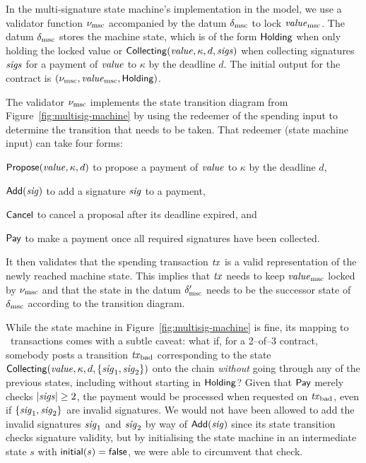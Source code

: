 In the multi-signature state machine's implementation in the \EUTXO{} model, we use a validator
function $\nu_{\mathrm{msc}}$ accompanied by the datum $\delta_{\mathrm{msc}}$ to lock
$\mathit{value}_{\mathrm{msc}}$. The datum $\delta_{\mathrm{msc}}$ stores the machine state,
which is of the form \(\mathsf{Holding}\) when only holding the locked value
or \(\mathsf{Collecting}(\mathit{value}, \kappa, d, \mathit{sigs})\) when collecting
signatures $\mathit{sigs}$ for a payment of $\mathit{value}$ to $\kappa$ by the deadline
$d$. The initial output for the contract is \((\nu_{\mathrm{msc}}, \mathit{value}_{\mathrm{msc}},
\mathsf{Holding})\).

The validator $\nu_{\mathrm{msc}}$ implements the state transition diagram from
Figure~\ref{fig:multisig-machine} by using the redeemer of the spending input to determine the transition that needs to be taken. That redeemer (state machine input) can take four forms:
\begin{inparaenum}[(1)]
\item \(\mathsf{Propose}(\mathit{value}, \kappa, d)\) to propose a payment of $\mathit{value}$ to $\kappa$
  by the deadline $d$,
\item \(\mathsf{Add}(\mathit{sig})\) to add a signature $\mathit{sig}$ to a payment,
\item $\mathsf{Cancel}$ to cancel a proposal after its deadline expired, and
\item $\mathsf{Pay}$ to make a payment once all required signatures have been collected.
\end{inparaenum}
It then validates that the spending transaction $\mathit{tx}$ is a valid
representation of the newly reached machine state. This implies that
$\mathit{tx}$ needs to keep $\mathit{value}_{\mathrm{msc}}$ locked by $\nu_{\mathrm{msc}}$ and that the
state in the datum $\delta^{\prime}_{\mathrm{msc}}$ needs to be the successor state
of $\delta_{\mathrm{msc}}$ according to the transition diagram.

While the state machine in Figure~\ref{fig:multisig-machine} is fine, its mapping to \EUTXO\ transactions comes with a subtle caveat: what if, for a 2--of--3 contract, somebody posts a transition $\mathit{tx}_{\mathrm{bad}}$ corresponding to the state \(\mathsf{Collecting}(\mathit{value}, \kappa, d, \{\mathit{sig}_1, \mathit{sig}_2\})\) onto the chain \emph{without} going through any of the previous states, including without starting in $\mathsf{Holding}$?
Given that $\mathsf{Pay}$ merely checks \(|\mathit{sigs}| \geq 2\), the payment would be processed when requested on $\mathit{tx}_{\mathrm{bad}}$, even if \(\{\mathit{sig}_1, \mathit{sig}_2\}\) are invalid signatures.
We would not have been allowed to add the invalid signatures $\mathit{sig}_1$ and $\mathit{sig}_2$ by way of \(\mathsf{Add}(\mathit{sig})\) since its state transition checks signature validity, but by initialising the state machine in an intermediate state $s$ with \(\textsf{initial}(s) = \textsf{false}\), we were able to circumvent that check.

